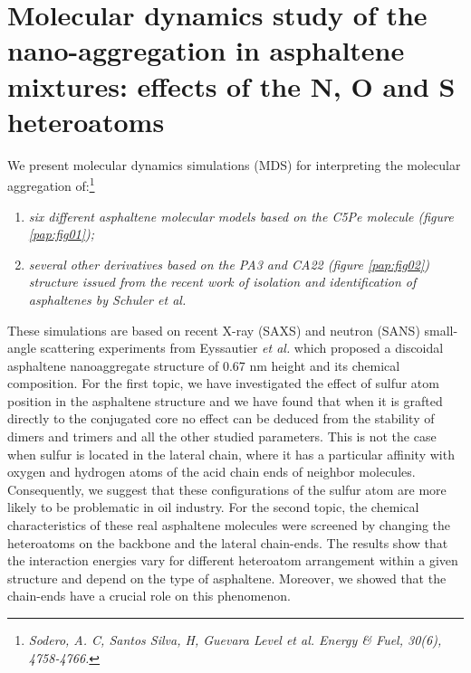 \singlespacing
\chapter[Molecular dynamics study of the nano-aggregation in asphaltene]{Molecular dynamics study of the nano-aggregation in asphaltene mixtures: effects of the N, O and S heteroatoms}
\minitoc
\restoregeometry

\newpage


We present molecular dynamics simulations (MDS) for interpreting the molecular aggregation of:\footnote{\textit{Sodero, A. C, Santos Silva, H, Guevara Level et al. Energy \& Fuel, 30(6), 4758-4766.}}
\begin{enumerate}
	\item \textit{six different asphaltene molecular models based on the C5Pe molecule (figure \ref{pap:fig01});}
	\item \textit{several other derivatives based on the PA3 and CA22 (figure \ref{pap:fig02}) structure issued from the recent work of isolation and identification of asphaltenes by Schuler \textit{et al.} \cite{schuler2015unraveling}}
\end{enumerate}    

These simulations are based on recent X-ray (SAXS) and neutron (SANS) small-angle scattering experiments from Eyssautier \textit{et al.} \cite{eyssautier2011insight} which proposed a discoidal asphaltene nanoaggregate structure of 0.67 nm height and its chemical composition. For the first topic, we have investigated the effect of sulfur atom position in the asphaltene structure and we have found that when it is grafted directly to the conjugated core no effect can be deduced from the stability of dimers and trimers and all the other studied parameters. This is not the case when sulfur is located in the lateral chain, where it has a particular affinity with oxygen and hydrogen atoms of the acid chain ends of neighbor molecules. Consequently, we suggest that these configurations of the sulfur atom are more likely to be problematic in oil industry. For the second topic, the chemical characteristics of these real asphaltene molecules were screened by changing the heteroatoms on the backbone and the lateral chain-ends. The results show that the interaction energies vary for different heteroatom arrangement within a given structure and depend on the type of asphaltene. Moreover, we showed that the chain-ends have a crucial role on this phenomenon.

\clearpage

